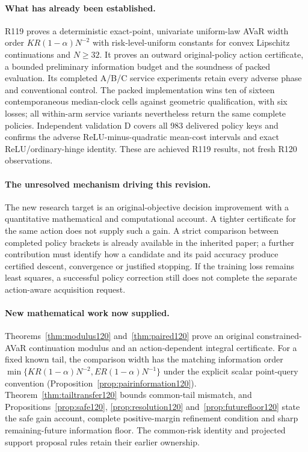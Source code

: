 \paragraph{What has already been established.}
R119 proves a deterministic exact-point, univariate uniform-law AVaR width order $KR(1-\alpha)N^{-2}$ with risk-level-uniform constants for convex Lipschitz continuations and $N\ge32$. It proves an outward original-policy action certificate, a bounded preliminary information budget and the soundness of packed evaluation. Its completed A/B/C service experiments retain every adverse phase and conventional control. The packed implementation wins ten of sixteen contemporaneous median-clock cells against geometric qualification, with six losses; all within-arm service variants nevertheless return the same complete policies. Independent validation D covers all 983 delivered policy keys and confirms the adverse ReLU-minus-quadratic mean-cost intervals and exact ReLU/ordinary-hinge identity. These are achieved R119 results, not fresh R120 observations.

\paragraph{The unresolved mechanism driving this revision.}
The new research target is an original-objective decision improvement with a quantitative mathematical and computational account. A tighter certificate for the same action does not supply such a gain. A strict comparison between completed policy brackets is already available in the inherited paper; a further contribution must identify how a candidate and its paid accuracy produce certified descent, convergence or justified stopping. If the training loss remains least squares, a successful policy correction still does not complete the separate action-aware acquisition request.

\paragraph{New mathematical work now supplied.}
Theorems~\ref{thm:modulus120} and~\ref{thm:paired120} prove an original
constrained-AVaR continuation modulus and an action-dependent integral
certificate. For a fixed known tail, the comparison width has the matching
information order
$\min\{KR(1-\alpha)N^{-2},ER(1-\alpha)N^{-1}\}$ under the explicit scalar
point-query convention (Proposition~\ref{prop:pairinformation120}).
Theorem~\ref{thm:tailtransfer120} bounds common-tail mismatch, and
Propositions~\ref{prop:safe120}, \ref{prop:resolution120}
and~\ref{prop:futurefloor120} state the safe gain account, complete
positive-margin refinement condition and sharp remaining-future
information floor. The common-risk identity and projected support
proposal rules retain their earlier ownership.

